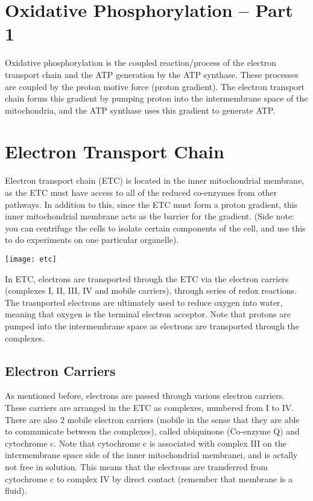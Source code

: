 \section{Oxidative Phosphorylation -- Part 1}

Oxidative phosphorylation is the coupled reaction/process of the electron transport chain and the ATP generation by the ATP synthase.
These processes are coupled by the proton motive force (proton gradient).
The electron transport chain forms this gradient by pumping proton into the intermembrane space of the mitochondria, and the ATP synthase uses this gradient to generate ATP.

\section{Electron Transport Chain}

Electron transport chain (ETC) is located in the inner mitochondrial membrane, as the ETC must have access to all of the reduced co-enzymes from other pathways.
In addition to this, since the ETC must form a proton gradient, this inner mitochondrial membrane acts as the barrier for the gradient.
(Side note: you can centrifuge the cells to isolate certain components of the cell, and use this to do experiments on one particular organelle).

\begin{center}
\texttt{[image: etc]}
\end{center}

In ETC, electrons are transported through the ETC via the electron carriers (complexes I, II, III, IV and mobile carriers), through series of redox reactions.
The trasnported electrons are ultimately used to reduce oxygen into water, meaning that oxygen is the terminal electron acceptor.
Note that protons are pumped into the intermembrane space as electrons are transported through the complexes.

\subsection{Electron Carriers}

As mentioned before, electrons are passed through various electron carriers.
These carriers are arranged in the ETC as complexes, numbered from I to IV.
There are also 2 mobile electron carriers (mobile in the sense that they are able to communicate between the complexes), called ubiquinone (Co-enzyme Q) and cytochrome c.
Note that cytochrome c is associated with complex III on the intermembrane space side of the inner mitochondrial membranei, and is actally not free in solution.
This means that the electrons are transferred from cytochrome c to complex IV by direct contact (remember that membrane is a fluid).


